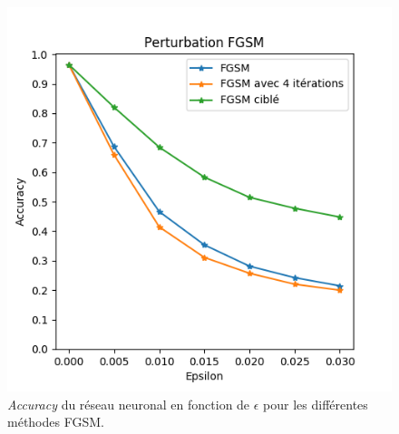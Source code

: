 \documentclass[10pt,twocolumn,letterpaper]{article}
\begin{document}
\begin{figure}[!hb]
\begin{center}
\includegraphics[width=0.85\linewidth]{ressources/fgsm_tget_plot.png}
\end{center}
   \caption{\textit{Accuracy} du réseau neuronal en fonction de $\epsilon$ pour les différentes méthodes FGSM.}
\label{fig:fgsm_tget_plot}
\end{figure}
\end{document}

